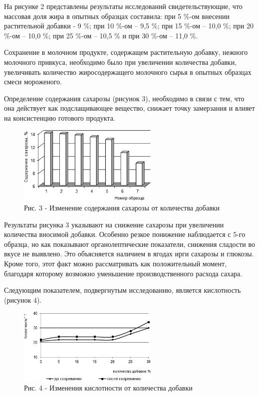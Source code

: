 \begin{multicols}{2}
На рисунке 2 представлены результаты исследований свидетельствующие, что
массовая доля жира в опытных образцах составила: при 5 \%-ом внесении
растительной добавки - 9 \%; при 10 \%-ом -- 9,5 \%; при 15 \%-ом --
10,0 \%; при 20 \%-ом -- 10,0 \%; при 25 \%-ом -- 10,5 \% и при 30 \%-ом
-- 11,0 \%.

Сохранение в молочном продукте, содержащем растительную добавку, нежного
молочного привкуса, необходимо было при увеличении количества добавки,
увеличивать количество жиросодержащего молочного сырья в опытных
образцах смеси мороженого.

Определение содержания сахарозы (рисунок 3), необходимо в связи с тем,
что она действует как подслащивающее вещество, снижает точку замерзания
и влияет на консистенцию готового продукта.
\end{multicols}

\begin{figure}[H]
	\centering
	\includegraphics[width=0.6\textwidth]{media/pish2/image12}
	\caption*{1 - без добавки; 2 - 5 \%; 3 -10 \%; 4 - 15 \%; 5 - 20 \%; 6 - 25 \%; 7 - 30 \%}
	\caption*{Рис. 3 - Изменение содержания сахарозы от количества добавки}
\end{figure}

\begin{multicols}{2}
Результаты рисунка 3 указывают на снижение сахарозы при увеличении
количества вносимой добавки. Особенно резкое понижение наблюдается с
5-го образца, но как показывают органолептические показатели, снижения
сладости во вкусе не выявлено. Это объясняется наличием в ягодах ирги
сахарозы и глюкозы. Кроме того, этот факт можно рассматривать как
положительный момент, благодаря которому возможно уменьшение
производственного расхода сахара.

Следующим показателем, подвергнутым исследованию, является кислотность
(рисунок 4).
\end{multicols}

\begin{figure}[H]
	\centering
	\includegraphics[width=0.6\textwidth]{media/pish2/image13}
	\caption*{Рис. 4 - Изменения кислотности от количества добавки}
\end{figure}

